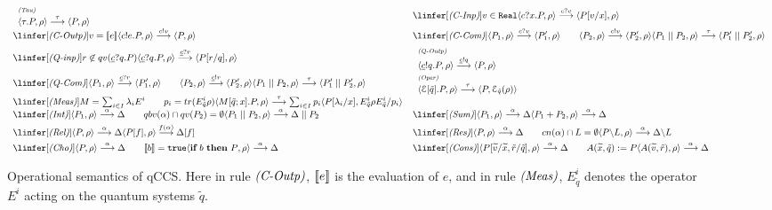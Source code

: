 \documentclass[a4paper,UKenglish,cleveref, autoref]{lipics-v2019}
\newcommand{\pair}[1]{\langle{#1}\rangle}
\newcommand{\qc}{\underline{c}}
\newcommand{\CE}{{\cal E}}
\newcommand{\ifthen}[2]{{\textbf{if} ~#1~ \textbf{then} ~#2}}
\begin{document}
\begin{figure}[t]
	\[\small\begin{array}{ll}
	\slinfer[\Rlts{Tau}]{\pair{\tau.P, \rho} \ar{\tau} \pair{P, \rho}}
	&\linfer[\Rlts{C-Inp}]{v\in\texttt{Real}}{\pair{c?x.P,\rho} \ar{c?v} \pair{P[v/x],\rho}}
	\\[3pt]
	\linfer[\Rlts{C-Outp}]{v=\Op{e}}{\pair{c!e.P,\rho} \ar{c!v} \pair{P,\rho} }
	
	&
	\linfer[\Rlts{C-Com}]{\pair{P_1,\rho}\ar{c?v}\pair{P'_1,\rho}\qquad
		\pair{P_2,\rho}\ar{c!v}\pair{P'_2,\rho}
	}
	{\pair{P_1\Cpar P_2,\rho} \ar{\tau} \pair{P'_1\Cpar P'_2,\rho} }
	\\[3pt]
	\linfer[\Rlts{Q-inp}]{r\not\in qv(\qc?q.P)}
	{\pair{\qc?q.P,\rho} \ar{\qc?r} \pair{P[r/q],\rho}}
	&
	\slinfer[\Rlts{Q-Outp}]{\pair{\qc!q.P,\rho} \ar{\qc!q} \pair{P,\rho} }
	\\[3pt]
	\linfer[\Rlts{Q-Com}]{\pair{P_1,\rho} \ar{\qc?r} \pair{P'_1,\rho} \qquad \pair{P_2,\rho}\ar{\qc!r} \pair{P'_2,\rho}}
	{\pair{P_1\Cpar P_2, \rho } \ar{\tau} \pair{P'_1\Cpar P'_2, \rho}}
	&
	\slinfer[\Rlts{Oper}]{\pair{\CE[\tilde{q}].P,\rho} \ar{\tau} \pair{P,\CE_{\tilde{q}}(\rho)}}
	\\[3pt]
	\linfer[\Rlts{Meas}]{M=\sum_{i\in I}\lambda_i E^i \qquad p_i=tr(E^i_{\tilde{q}}\rho)}
	{\pair{M[\tilde{q};x].P,\rho} \ar{\tau} \sum_{i\in I}p_i \pair{P[\lambda_i/x], E^i_{\tilde{q}}\rho E^i_{\tilde{q}} / p_i}}
	&
	\\
	\linfer[\Rlts{Int}]{\pair{P_1,\rho} \ar{\alpha} \Delta\qquad qbv(\alpha)\cap qv(P_2)=\emptyset}{\pair{P_1 \Cpar P_2,\rho} \ar{\alpha} \Delta\Cpar P_2}
	&
	\linfer[\Rlts{Sum}]{\pair{P_1,\rho} \ar{\alpha} \Delta}{\pair{P_1+P_2,\rho} \ar{\alpha} \Delta}
	\\[3pt]
	\linfer[\Rlts{Rel}]{\pair{P,\rho} \ar{\alpha} \Delta}{\pair{P[f],\rho} \ar{f(\alpha)} \Delta[f]}
	&
	\linfer[\Rlts{Res}]{\pair{P,\rho} \ar{\alpha} \Delta \qquad cn(\alpha)\cap L=\emptyset}{\pair{P\backslash L,\rho} \ar{\alpha} \Delta\backslash L}
	\\[3pt]
	\linfer[\Rlts{Cho}]{\pair{P,\rho} \ar{\alpha} \Delta \qquad \Op{b}=\texttt{true}}{\pair{\ifthen{b}{P},\rho} \ar{\alpha} \Delta}
	&
	\linfer[\Rlts{Cons}]{\pair{P[\widetilde{v}/\widetilde{x},\tilde{r}/\tilde{q}],\rho} \ar{\alpha} \Delta \qquad A(\widetilde{x}, \tilde{q})\Defs P}{\pair{A(\widetilde{v},\tilde{r}),\rho} \ar{\alpha} \Delta}
	\end{array}\]
	\caption{Operational semantics of qCCS. Here in rule $\textit{(C-Outp)}$, $\mbox{[\![}e\mbox{]\!]}$ is the evaluation of $e$, and in rule $\textit{(Meas)}$, $E^i_{\tilde{q}}$ denotes the operator $E^i$ acting on the quantum systems $\tilde{q}$.\label{fig:opsem}
	}
\end{figure}
\end{document}
